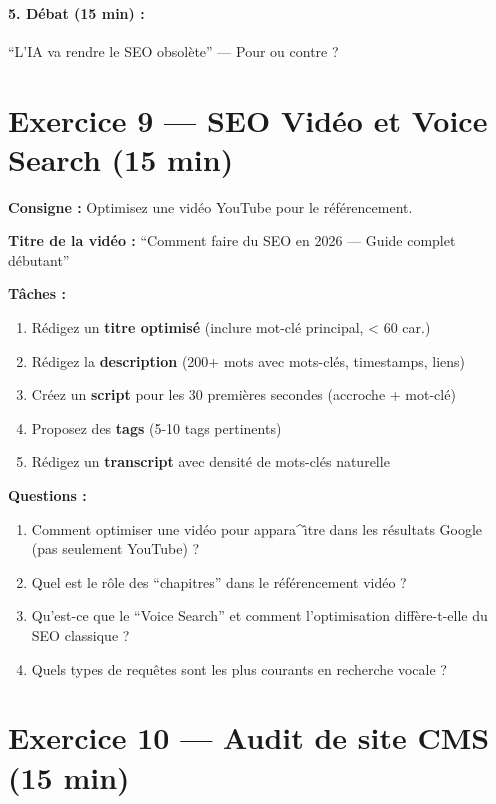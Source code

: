 \documentclass[12pt,a4paper]{report}
\begin{document}
\paragraph{5. D\'{e}bat (15 min) :} ``L'IA va rendre le SEO obsol\`{e}te'' --- Pour ou contre ?

\section{Exercice 9 --- SEO Vid\'{e}o et Voice Search (15 min)}

\textbf{Consigne :} Optimisez une vid\'{e}o YouTube pour le r\'{e}f\'{e}rencement.

\textbf{Titre de la vid\'{e}o :} ``Comment faire du SEO en 2026 --- Guide complet d\'{e}butant''

\textbf{T\^aches :}
\begin{enumerate}
    \item R\'{e}digez un \textbf{titre optimis\'{e}} (inclure mot-cl\'{e} principal, < 60 car.)
    \item R\'{e}digez la \textbf{description} (200+ mots avec mots-cl\'{e}s, timestamps, liens)
    \item Cr\'{e}ez un \textbf{script} pour les 30 premi\`{e}res secondes (accroche + mot-cl\'{e})
    \item Proposez des \textbf{tags} (5-10 tags pertinents)
    \item R\'{e}digez un \textbf{transcript} avec densit\'{e} de mots-cl\'{e}s naturelle
\end{enumerate}

\textbf{Questions :}
\begin{enumerate}
    \item Comment optimiser une vid\'{e}o pour appara^{\^\i}tre dans les r\'{e}sultats Google (pas seulement YouTube) ?
    \item Quel est le r\^{o}le des ``chapitres'' dans le r\'{e}f\'{e}rencement vid\'{e}o ?
    \item Qu'est-ce que le ``Voice Search'' et comment l'optimisation diff\`{e}re-t-elle du SEO classique ?
    \item Quels types de requ\^{e}tes sont les plus courants en recherche vocale ?
\end{enumerate}

\section{Exercice 10 --- Audit de site CMS (15 min)}
\end{document}
